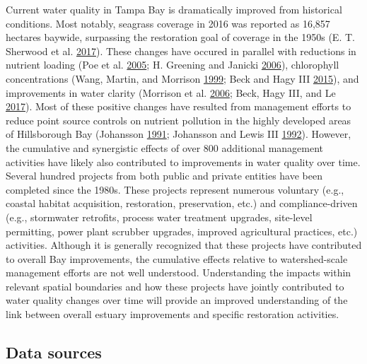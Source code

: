 \documentclass[]{article}
\begin{document}
Current water quality in Tampa Bay is dramatically improved from
historical conditions. Most notably, seagrass coverage in 2016 was
reported as 16,857 hectares baywide, surpassing the restoration goal of
coverage in the 1950s (E. T. Sherwood et al.
\protect\hyperlink{ref-Sherwood17}{2017}). These changes have occured in
parallel with reductions in nutrient loading (Poe et al.
\protect\hyperlink{ref-Poe05}{2005}; H. Greening and Janicki
\protect\hyperlink{ref-Greening06}{2006}), chlorophyll concentrations
(Wang, Martin, and Morrison \protect\hyperlink{ref-Wang99}{1999}; Beck
and Hagy III \protect\hyperlink{ref-Beck15}{2015}), and improvements in
water clarity (Morrison et al. \protect\hyperlink{ref-Morrison06}{2006};
Beck, Hagy III, and Le \protect\hyperlink{ref-Beck17c}{2017}). Most of
these positive changes have resulted from management efforts to reduce
point source controls on nutrient pollution in the highly developed
areas of Hillsborough Bay (Johansson
\protect\hyperlink{ref-Johansson91}{1991}; Johansson and Lewis III
\protect\hyperlink{ref-Johansson92}{1992}). However, the cumulative and
synergistic effects of over 800 additional management activities have
likely also contributed to improvements in water quality over time.
Several hundred projects from both public and private entities have been
completed since the 1980s. These projects represent numerous voluntary
(e.g., coastal habitat acquisition, restoration, preservation, etc.) and
compliance-driven (e.g., stormwater retrofits, process water treatment
upgrades, site-level permitting, power plant scrubber upgrades, improved
agricultural practices, etc.) activities. Although it is generally
recognized that these projects have contributed to overall Bay
improvements, the cumulative effects relative to watershed-scale
management efforts are not well understood. Understanding the impacts
within relevant spatial boundaries and how these projects have jointly
contributed to water quality changes over time will provide an improved
understanding of the link between overall estuary improvements and
specific restoration activities.

\subsection{Data sources}\label{data-sources}
\end{document}
